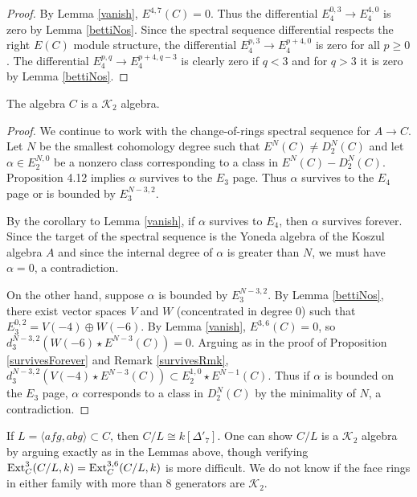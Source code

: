 \documentclass[11pt,righttag]{amsart}
\begin{document}
\begin{proof}
By Lemma \ref{vanish}, $E^{4,7}(C)=0$. Thus the differential $E_4^{0,3}\rightarrow E_4^{4,0}$ is zero by Lemma \ref{bettiNos}. Since the spectral sequence differential respects the right $E(C)$ module structure, the differential $E_4^{p,3}\rightarrow E_4^{p+4,0}$ is zero for all $p\ge 0$. The differential $E_4^{p,q}\rightarrow E_4^{p+4,q-3}$ is clearly zero if $q<3$ and for $q>3$ it is zero by Lemma \ref{bettiNos}.

\end{proof}

\begin{lemma}
The algebra  $C$ is a $\mathcal K_2$ algebra.
\end{lemma}

\begin{proof}
We continue to work with the change-of-rings spectral sequence for $A\rightarrow C$.
Let $N$ be the smallest cohomology degree such that $E^N(C)\neq D_2^N(C)$ and let $\alpha\in E_2^{N,0}$ be a nonzero class corresponding to a class in $E^N(C)-D_2^N(C)$. Proposition 4.12 implies $\alpha$ survives to the $E_3$ page. Thus $\alpha$ survives to the $E_4$ page or is bounded by $E_3^{N-3,2}$. 

By the corollary to Lemma \ref{vanish}, if $\alpha$ survives to $E_4$, then $\alpha$ survives forever. Since the target of the spectral sequence is the Yoneda algebra of the Koszul algebra $A$ and since the internal degree of $\alpha$ is greater than $N$, we must have $\alpha=0$, a contradiction.

On the other hand, suppose $\alpha$ is bounded by $E_3^{N-3,2}$. By Lemma \ref{bettiNos}, there exist vector spaces $V$ and $W$ (concentrated in degree 0) such that $E_3^{0,2}=V(-4)\oplus W(-6)$. By Lemma \ref{vanish}, $E^{3,6}(C)=0$, so $d_3^{N-3,2}(W(-6)\star E^{N-3}(C))=0$. Arguing as in the proof of Proposition \ref{survivesForever} and Remark \ref{survivesRmk}, $d_3^{N-3,2}(V(-4)\star E^{N-3}(C))\subset E_2^{1,0}\star E^{N-1}(C)$.  Thus if $\alpha$ is bounded on the $E_3$ page, $\alpha$ corresponds to a class in $D_2^N(C)$ by the minimality of $N$, a contradiction.

\end{proof}

If $L={\langle} afg, abg{\rangle}\subset C$, then $C/L{\cong} k[{\Delta}'_7]$. One can show $C/L$ is a ${{\mathcal K}}_2$ algebra by arguing exactly as in the Lemmas above, though verifying ${\hbox{{\rm Ext}}}_C^3(C/L,k)={\hbox{{\rm Ext}}}_C^{3,6}(C/L,k)$ is more difficult.    We do not know if the face rings in either family with more than 8 generators are ${{\mathcal K}}_2$.

  
  
 

\end{document}
